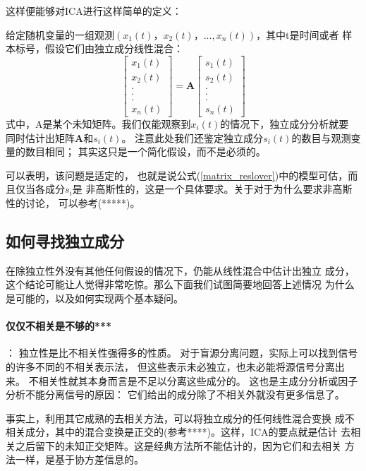 这样便能够对ICA进行这样简单的定义：

给定随机变量的一组观测$(x_1(t)，x_2(t)，...,x_n(t))$，其中t是时间或者
样本标号，假设它们由独立成分线性混合：
\begin{equation} \label{matrix_reslover}
\left[ \begin{array}{c} 
x_1(t) \\
x_2(t) \\
. \\
. \\
. \\
x_n(t)
\end{array} \right]
=\bm{A}
\left[ \begin{array}{c} 
s_1(t) \\
s_2(t) \\
. \\
. \\
. \\
s_n(t)
\end{array} \right]
\end{equation}
式中，A是某个未知矩阵。我们仅能观察到$x_i(t)$的情况下，独立成分分析就要
同时估计出矩阵$\bm{A}$和$s_i(t)$。
注意此处我们还鉴定独立成分$s_i(t)$的数目与观测变量的数目相同；
其实这只是一个简化假设，而不是必须的。

可以表明，该问题是适定的，
也就是说公式(\ref{matrix_reslover})中的模型可估，而且仅当各成分$s_i$是
非高斯性的，这是一个具体要求。关于对于为什么要求非高斯性的讨论，
可以参考(*****)。
    
\subsection{如何寻找独立成分}
在除独立性外没有其他任何假设的情况下，仍能从线性混合中估计出独立
成分，这个结论可能让人觉得非常吃惊。那么下面我们试图简要地回答上述情况
为什么是可能的，以及如何实现两个基本疑问。
\paragraph*{仅仅不相关是不够的***}：
独立性是比不相关性强得多的性质。
对于盲源分离问题，实际上可以找到信号的许多不同的不相关表示法，
但这些表示未必独立，也未必能将源信号分离出来。
不相关性就其本身而言是不足以分离这些成分的。
这也是主成分分析或因子分析不能分离信号的原因：
它们给出的成分除了不相关外就没有更多信息了。
    
事实上，利用其它成熟的去相关方法，可以将独立成分的任何线性混合变换
成不相关成分，其中的混合变换是正交的(参考****)。这样，ICA的要点就是估计
去相关之后留下的未知正交矩阵。这是经典方法所不能估计的，因为它们和去相关
方法一样，是基于协方差信息的。
    
